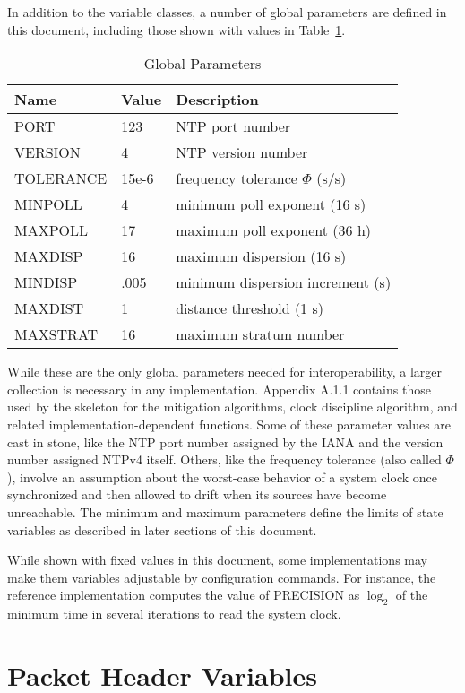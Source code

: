 In addition to the variable classes, a number of global parameters
are defined in this document, including those shown with values in
Table~\ref{global_parameters}.

\begin{table}[htb]
\center
\begin{tabular}{| l | l | l |}
\hline
Name & Value & Description \\
\hline
\hline
PORT & 123 & NTP port number \\
VERSION & 4 & NTP version number \\
TOLERANCE & 15e-6 & frequency tolerance $ \Phi $ (s/s) \\
MINPOLL & 4 & minimum poll exponent (16 s) \\
MAXPOLL & 17 & maximum poll exponent (36 h) \\
MAXDISP & 16 & maximum dispersion (16 s) \\
MINDISP & .005 & minimum dispersion increment (s) \\
MAXDIST & 1 & distance threshold (1 s) \\
MAXSTRAT & 16 & maximum stratum number \\
\hline
\end{tabular}
\caption{Global Parameters}
\label{global_parameters}
\end{table}

While these are the only global parameters needed for
interoperability, a larger collection is necessary in any
implementation. Appendix A.1.1 contains those used by the skeleton
for the mitigation algorithms, clock discipline algorithm, and
related implementation-dependent functions. Some of these parameter
values are cast in stone, like the NTP port number assigned by the
IANA and the version number assigned NTPv4 itself. Others, like the
frequency tolerance (also called $ \Phi $), involve an assumption about
the worst-case behavior of a system clock once synchronized and then
allowed to drift when its sources have become unreachable. The
minimum and maximum parameters define the limits of state variables
as described in later sections of this document.

While shown with fixed values in this document, some implementations
may make them variables adjustable by configuration commands. For
instance, the reference implementation computes the value of
PRECISION as $ \log_2 $ of the minimum time in several iterations to read
the system clock.

\section{Packet Header Variables}
\label{section-7-3}

